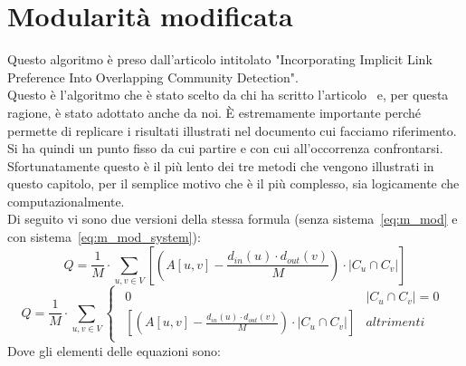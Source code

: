 \section{Modularità modificata}
Questo algoritmo\cite{M-mod_code} è preso dall'articolo intitolato "Incorporating Implicit Link Preference Into Overlapping Community Detection"\cite{M-mod_paper}.\\
Questo è l'algoritmo che è stato scelto da chi ha scritto l'articolo \cnrl\ e, per questa ragione, è stato adottato anche da noi. È estremamente importante perché permette di replicare i risultati illustrati nel documento cui facciamo riferimento. Si ha quindi un punto fisso da cui partire e con cui all'occorrenza confrontarsi.\\
Sfortunatamente questo è il più lento dei tre metodi che vengono illustrati in questo capitolo, per il semplice motivo che è il più complesso, sia logicamente che computazionalmente.\\
Di seguito vi sono due versioni della stessa formula (senza sistema~\ref{eq:m_mod} e con sistema~\ref{eq:m_mod_system}):
\begin{equation}
	Q = \frac{1}{M} \cdot \sum_{u,v \in V}
		\left[
			\left( A \left[ u,v \right] - \frac{ d_{in}\left(u\right) \cdot d_{out}\left(v\right) }{M} \right)
			\cdot
			|C_u \cap C_v| 
		\right]
	\label{eq:m_mod}
\end{equation}
%
\begin{equation}
	Q = \frac{1}{M} \cdot \sum_{u,v \in V}
		\begin{cases}
			\begin{array}{ll}
				0 & |C_u \cap C_v| = 0 \\
				\left[ \left( A \left[ u,v \right] - \frac{ d_{in}\left(u\right) \cdot d_{out}\left(v\right) }{M} \right) \cdot |C_u \cap C_v| \right]
				& altrimenti
			\end{array}
		\end{cases}
	\label{eq:m_mod_system}
\end{equation}
Dove gli elementi delle equazioni sono:
